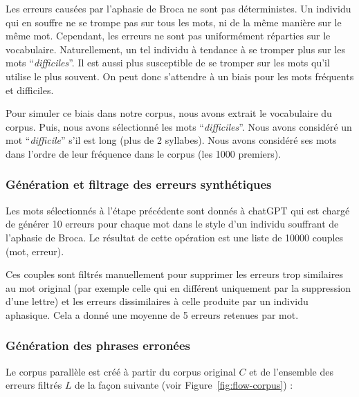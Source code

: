 Les erreurs causées par l'aphasie de Broca ne sont pas déterministes.
Un individu qui en souffre ne se trompe pas sur tous les mots, ni de la même manière sur le même mot.
Cependant, les erreurs ne sont pas uniformément réparties sur le vocabulaire.
Naturellement, un tel individu à tendance à se tromper plus sur les mots ``\emph{difficiles}''.
Il est aussi plus susceptible de se tromper sur les mots qu'il utilise le plus souvent.
On peut donc s'attendre à un biais pour les mots fréquents et difficiles.

Pour simuler ce biais dans notre corpus, nous avons extrait le vocabulaire du corpus.
Puis, nous avons sélectionné les mots ``\emph{difficiles}''. 
Nous avons considéré un mot ``\emph{difficile}'' s'il est long (plus de 2 syllabes).
Nous avons considéré ses mots dans l'ordre de leur fréquence dans le corpus (les 1000 premiers).

\subsubsection{Génération et filtrage des erreurs synthétiques}

Les mots sélectionnés à l'étape précédente sont donnés à chatGPT 
qui est chargé de générer 10 erreurs pour chaque mot dans le style d'un individu souffrant de l'aphasie de Broca.
Le résultat de cette opération est une liste de 10000 couples (mot, erreur).

Ces couples sont filtrés manuellement pour supprimer les erreurs trop similaires au mot original 
(par exemple celle qui en différent uniquement par la suppression d'une lettre)
et les erreurs dissimilaires à celle produite par un individu aphasique.
Cela a donné une moyenne de 5 erreurs retenues par mot.

\subsubsection{Génération des phrases erronées}

Le corpus parallèle est créé à partir du corpus original \(C\) et de l'ensemble des erreurs filtrés \(L\) 
de la façon suivante (voir Figure~\ref{fig:flow-corpus}) :

